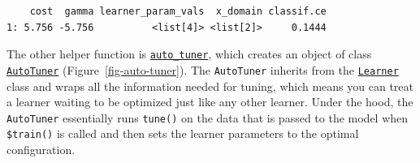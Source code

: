 \begin{Shaded}
\begin{Highlighting}[]
\OtherTok{=} \NormalTok{(}\NormalTok{, } \NormalTok{, } \NormalTok{)}
\OtherTok{=} \NormalTok{(}\NormalTok{,}
   \NormalTok{(}\NormalTok{, }\NormalTok{, } \NormalTok{),}
   \NormalTok{(}\NormalTok{, }\NormalTok{, } \NormalTok{),}
   \NormalTok{,}
   
\NormalTok{)}
\OtherTok{=} \NormalTok{(}\NormalTok{, } \NormalTok{)}
\OtherTok{=} \NormalTok{(}\NormalTok{)}

\OtherTok{=} \NormalTok{(}
\NormalTok{)}
\SpecialCharTok{$}
\end{Highlighting}
\end{Shaded}

\begin{verbatim}
    cost  gamma learner_param_vals  x_domain classif.ce
1: 5.756 -5.756          <list[4]> <list[2]>     0.1444
\end{verbatim}

The other helper function is
\href{https://mlr3tuning.mlr-org.com/reference/auto_tuner.html}{\texttt{auto\_tuner}},
which creates an object of class
\href{https://mlr3tuning.mlr-org.com/reference/AutoTuner.html}{\texttt{AutoTuner}}
(Figure~\ref{fig-auto-tuner}). The \texttt{AutoTuner} inherits from the
\href{https://mlr3.mlr-org.com/reference/Learner.html}{\texttt{Learner}}
class and wraps all the information needed for tuning, which means you
can treat a learner waiting to be optimized just like any other learner.
Under the hood, the \texttt{AutoTuner} essentially runs \texttt{tune()}
on the data that is passed to the model when \texttt{\$train()} is
called and then sets the learner parameters to the optimal
configuration.

